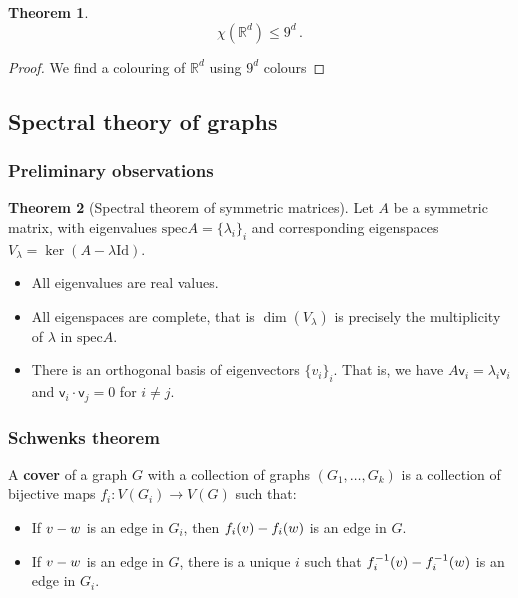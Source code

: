 \documentclass[12pt]{amsart}
\theoremstyle{definition}
\newtheorem{thm}{Theorem}[section]
\newcommand{\R}{\mathbb{R}}
\newcommand{\vv}{\mathsf{v}}
\newcommand{\Id}{\mathrm{Id}}
\newcommand{\spec}{\mathrm{spec}}
\begin{document}
\begin{thm}
$$\chi(\R^d) \leq 9^d \, .$$
\end{thm}

\begin{proof}
We find a colouring of $\R^d$ using $9^d $ colours
\end{proof}

\subsection{Spectral theory of graphs}


\subsubsection*{Preliminary observations}


\begin{thm}[Spectral theorem of symmetric matrices]
Let $A$ be a symmetric matrix, with eigenvalues $\spec A = \{\lambda_i\}_i$ and corresponding eigenspaces $V_{\lambda} = \ker(A - \lambda \Id)$.

\begin{itemize}
\item All eigenvalues are real values.

\item All eigenspaces are complete, that is $\dim (V_{\lambda})$ is precisely the multiplicity of $\lambda $ in $\spec A$.

\item There is an orthogonal basis of eigenvectors $\{v_i\}_i$.
That is, we have $A \vv_i = \lambda_i \vv_i$ and $\vv_i \cdot \vv_j = 0 $ for $i \neq j$.
\end{itemize}
\end{thm}

\subsubsection*{Schwenks theorem}

A \textbf{cover} of a graph $G$ with a collection of graphs $(G_1, \ldots , G_k)$ is a collection of bijective maps $f_i: V(G_i) \to V(G)$ such that:
\begin{itemize}
\item If $v \-- w$ is an edge in $G_i$, then $f_i(v) \-- f_i(w)$ is an edge in $G$.

\item If $v \-- w $ is an edge in $G$, there is a unique $i$ such that $f_i^{-1}(v) \-- f_i^{-1}(w)$ is an edge in $G_i$.
\end{itemize}
\end{document}
